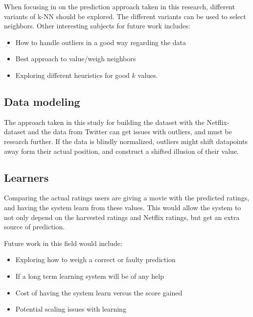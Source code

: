 When focusing in on the prediction approach taken in this research, different variants of k-NN should be explored. The different variants can be used to select neighbors. Other interesting subjects for future work includes:

\begin{itemize}
    \item How to handle outliers in a good way regarding the data
    \item Best approach to value/weigh neighbors
    \item Exploring different heuristics for good $k$ values.
\end{itemize}



\subsection{Data modeling}
The approach taken in this study for building the dataset with the Netflix-dataset and the data from Twitter can get issues with outliers, and must be research further. If the data is blindly normalized, outliers might shift datapoints away form their actual position, and construct a shifted illusion of their value.


\subsection{Learners}
Comparing the actual ratings users are giving a movie with the predicted ratings, and having the system learn from these values. This would allow the system to not only depend on the harvested ratings and Netflix ratings, but get an extra source of prediction.

Future work in this field would include:
\begin{itemize}
    \item Exploring how to weigh a correct or faulty prediction
    \item If a long term learning system will be of any help
    \item Cost of having the system learn versus the score gained
    \item Potential scaling issues with learning
\end{itemize}


